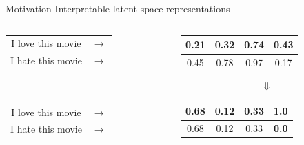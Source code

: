 \documentclass{beamer}
\begin{document}
\begin{frame}{Motivation}
  \centering
  {\LARGE Interpretable latent space representations} \\
  \vspace{1cm}
  \begin{columns}[T] %
    \begin{column}{.3\textwidth}
      \centering
      \begin{tabular}{ c c }
        I love this movie & $\rightarrow$ \\
        I hate this movie & $\rightarrow$ \\
      \end{tabular} \\
      \vspace{1.8cm}
      \begin{tabular}{ c c }
        I love this movie & $\rightarrow$ \\
        I hate this movie & $\rightarrow$ \\
      \end{tabular}
    \end{column}
    \hfill
    \begin{column}{.6\textwidth}
      \centering
      \begin{tabular}{ | c | c | c | c | }
        \hline
        0.21 & 0.32 & 0.74 & 0.43 \\
        \hline
        0.45 & 0.78 & 0.97 & 0.17 \\
        \hline
      \end{tabular}
      {\Huge$$\Downarrow$$}
      \begin{tabular}{ | c | c | c | c | }
        \hline
        0.68 & 0.12 & 0.33 & {\color{red}\textbf{1.0}} \\
        \hline
        \hline
        0.68 & 0.12 & 0.33 & {\color{red}\textbf{0.0}} \\
        \hline
      \end{tabular}
    \end{column}
  \end{columns}
\end{frame}
\end{document}
